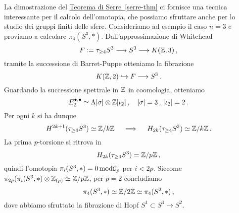 \begin{oss}
	La dimostrazione del \hyperref[serre-thm]{Teorema di Serre~\ref{serre-thm}} ci fornisce
	una tecnica interessante per il calcolo dell'omotopia,
	che possiamo sfruttare anche per lo studio dei gruppi
	finiti delle sfere. Consideriamo ad esempio il caso $n=3$
	e proviamo a calcolare $\pi_{4}(S^{3},\ast)$.
	Dall'approssimazione di Whitehead
	\begin{equation*}
		F := \tau_{\ge 4}S^{3} \longrightarrow
		S^{3} \longrightarrow K({\mathbb Z},3)\,,
	\end{equation*}
	tramite la successione di Barret-Puppe otteniamo
	la fibrazione
	\begin{equation*}
		K({\mathbb Z},2) \hookrightarrow F \longrightarrow S^{3}\,.
	\end{equation*}
	Guardando la successione spettrale in ${\mathbb Z}$ in coomologia,
	otteniamo
	\begin{equation*}
		E_{2}^{\bullet,\bullet} \simeq \Lambda[\sigma] \otimes {\mathbb Z}[\iota_{2}]\,,
		\quad \lvert \sigma \rvert = 3\,,\, \lvert \iota_{2} \rvert = 2\,.
	\end{equation*}
	Per ogni $k$ si ha dunque
	\begin{equation*}
		H^{2k+1}(\tau_{\ge 4} S^{3}) \simeq {\mathbb Z}/k{\mathbb Z}
		\quad \implies \quad
		H_{2k}(\tau_{\ge 4} S^{3}) \simeq {\mathbb Z}/k{\mathbb Z}\,.
	\end{equation*}
	La prima $p$-torsione si ritrova in
	\begin{equation*}
		H_{2k}(\tau_{\ge 4} S^{3}) = {\mathbb Z}/p {\mathbb Z}\,,
	\end{equation*}
	quindi l'omotopia $\pi_{i}(S^{3},\ast)=0 \, \mathrm{mod}\mathcal{C}_{p}$ per $i < 2p$.
	Siccome $\pi_{2p}(\pi_{i}(S^{3},\ast) \otimes {\mathbb Z}_{(p)} \simeq {\mathbb Z}/p{\mathbb Z}$,
	per $p=2$ concludiamo
	\begin{equation*}
		\pi_{4}(S^{3},\ast) \simeq {\mathbb Z}/2{\mathbb Z} \simeq \pi_{4}(S^{2},\ast)\,,
	\end{equation*}
	dove abbiamo sfruttato la fibrazione di Hopf $S^{1} \subset S^{3} \to S^{2}$.
\end{oss}